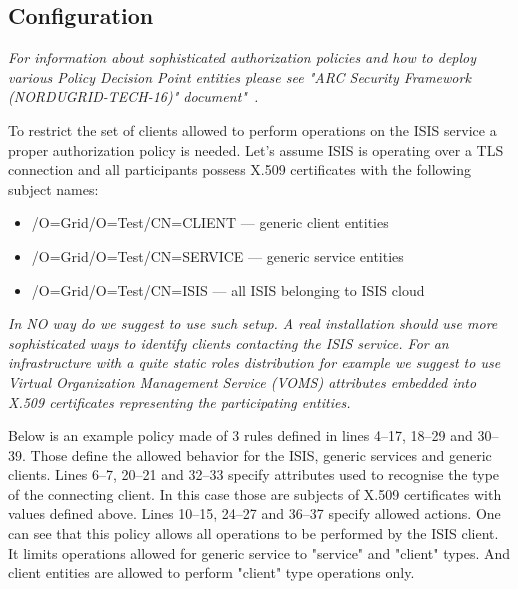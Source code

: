 \documentclass{book}
\begin{document}

\subsection{Configuration}
\label{sub:isis_authorization_configuration}

\textit{For information about sophisticated authorization policies and how to deploy various Policy Decision Point entities please see "ARC Security Framework (NORDUGRID-TECH-16)" document"~\cite{arc1-security}.}

To restrict the set of clients allowed to perform operations on the ISIS service a proper authorization policy is needed. Let's assume ISIS is operating over a TLS connection and all participants possess X.509 certificates with the following subject names:
\begin{itemize}
\item /O=Grid/O=Test/CN=CLIENT --- generic client entities
\item /O=Grid/O=Test/CN=SERVICE --- generic service entities
\item /O=Grid/O=Test/CN=ISIS --- all ISIS belonging to ISIS cloud
\end{itemize}

\textit{In NO way do we suggest to use such setup. A real installation should use more sophisticated ways to 
identify clients contacting the ISIS service. For an infrastructure with a quite static roles distribution for 
example we suggest to use Virtual Organization Management Service (VOMS) attributes embedded into X.509 
certificates representing the participating entities.}

Below is an example policy made of 3 rules defined in lines 4--17, 18--29 and 30--39. Those define the allowed 
behavior for the ISIS, generic services and generic clients. Lines 6--7, 20--21 and 32--33 specify attributes 
used to recognise the type of the connecting client. In this case those are subjects of X.509 certificates with 
values defined above. Lines 10--15, 24--27 and 36--37 specify allowed actions. One can see that this policy 
allows all operations to be performed by the ISIS client. It limits operations allowed for generic service 
to "service" and "client" types. And client entities are allowed to perform "client" type operations only.
\end{document}

